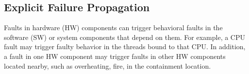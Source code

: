 \subsection{Explicit Failure Propagation} 
Faults in hardware (HW) components can trigger behavioral faults in the software (SW) or system components that depend on them. For example, a CPU fault may trigger faulty behavior in the threads bound to that CPU. In addition, a fault in one HW component may trigger faults in other HW components located nearby, such as overheating, fire, 
in the containment location. %

